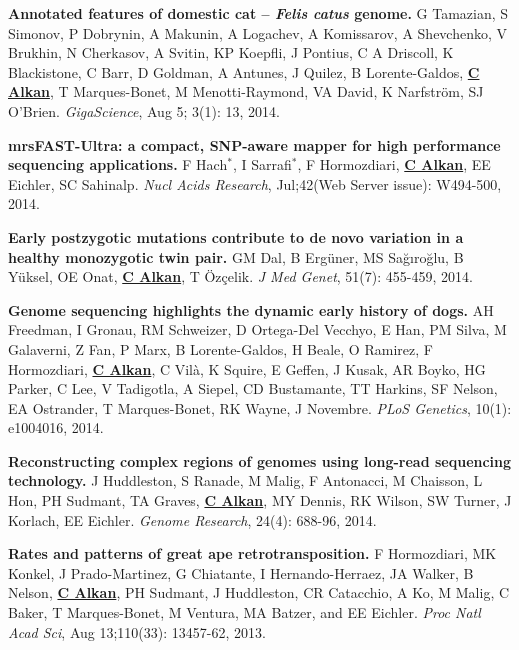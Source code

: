   \vspace{-.2cm}        
  {\bf Annotated features of domestic cat – \textit{Felis catus} genome.}
  G Tamazian, S Simonov, P Dobrynin, A Makunin, A Logachev, 
  A Komissarov, A Shevchenko, V Brukhin, N Cherkasov, A Svitin,
  KP Koepfli, J Pontius, C A Driscoll, K Blackistone, C Barr, 
  D Goldman, A Antunes, J Quilez, B Lorente-Galdos,  {\bf {\underline {C Alkan}}},
  T Marques-Bonet, M Menotti-Raymond, VA David, K Narfström, SJ O’Brien.
  {\em GigaScience}, Aug 5; 3(1): 13, 2014.
       
       
       
  \vspace{-.2cm}        
  {\bf mrsFAST-Ultra: a compact, SNP-aware mapper for high performance sequencing applications.}
    F Hach$^*$,
    I Sarrafi$^*$,
    F Hormozdiari,
    {\bf {\underline {C Alkan}}},
    EE Eichler,   SC Sahinalp.
    {\em Nucl Acids Research}, Jul;42(Web Server issue): W494-500, 2014.

  \vspace{-.2cm}        
         {\bf Early postzygotic mutations contribute to de novo variation in a healthy monozygotic twin pair.}
         GM Dal, B Ergüner, MS Sağıroğlu, B Yüksel, OE Onat, {\bf {\underline {C Alkan}}}, T Özçelik. 
         {\em J Med Genet}, 51(7): 455-459, 2014.

  
  \vspace{-.2cm}        
         {\bf Genome sequencing highlights the dynamic early history of dogs.} 
         AH Freedman, I Gronau, RM Schweizer, D Ortega-Del Vecchyo, E Han, PM Silva, 
         M Galaverni, Z Fan, P Marx, B Lorente-Galdos, H Beale, O Ramirez, F Hormozdiari, 
         {\bf {\underline {C Alkan}}}, 
         C Vilà, K Squire, E Geffen, J Kusak, AR Boyko, HG Parker, 
         C Lee, V Tadigotla, A Siepel, CD Bustamante, TT Harkins, SF Nelson, 
         EA Ostrander, T Marques-Bonet, RK Wayne, J Novembre. 
         {\em PLoS Genetics}, 10(1): e1004016, 2014.


 \vspace{-.2cm}        
        {\bf Reconstructing complex regions of genomes using long-read sequencing technology.}
         J Huddleston, S Ranade, M Malig, F Antonacci, M Chaisson, L Hon, PH Sudmant, TA Graves, 
         {\bf {\underline{C Alkan}}}, MY Dennis, RK Wilson, SW Turner, J Korlach, EE Eichler. 
         {\em Genome Research},  24(4): 688-96, 2014.


 \vspace{-.2cm}        
        {\bf Rates and patterns of great ape retrotransposition.}
        F Hormozdiari, MK Konkel, J Prado-Martinez, G Chiatante, I Hernando-Herraez, JA Walker, B Nelson, {\bf {\underline {C Alkan}}}, PH Sudmant, J Huddleston, CR Catacchio, A Ko, 
        M Malig, C Baker, T Marques-Bonet, M Ventura, MA Batzer, and EE Eichler. 
        {\em Proc Natl Acad Sci}, Aug 13;110(33): 13457-62, 2013.
                             


